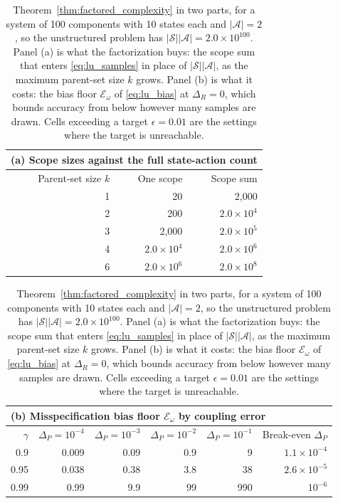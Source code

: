 \begin{table}[htbp]
\centering
\caption{Theorem~\ref{thm:factored_complexity} in two parts, for a system of 100 components with 10 states each and $|\mathcal{A}| = 2$, so the unstructured problem has $|\mathcal{S}||\mathcal{A}| = 2.0 \times 10^{100}$. Panel (a) is what the factorization buys: the scope sum that enters \eqref{eq:lu_samples} in place of $|\mathcal{S}||\mathcal{A}|$, as the maximum parent-set size $k$ grows. Panel (b) is what it costs: the bias floor $\mathcal{E}_\omega$ of \eqref{eq:lu_bias} at $\Delta_R = 0$, which bounds accuracy from below however many samples are drawn. Cells exceeding a target $\epsilon = 0.01$ are the settings where the target is unreachable.}
\label{tab:curse_factored}
\begin{tabular}{rrr}
\multicolumn{3}{l}{(a) Scope sizes against the full state-action count} \\
\toprule
Parent-set size $k$ & One scope & Scope sum \\
\midrule
1 & 20 & 2,000 \\
2 & 200 & $2.0 \times 10^{4}$ \\
3 & 2,000 & $2.0 \times 10^{5}$ \\
4 & $2.0 \times 10^{4}$ & $2.0 \times 10^{6}$ \\
6 & $2.0 \times 10^{6}$ & $2.0 \times 10^{8}$ \\
\bottomrule
\end{tabular}

\vspace{1em}

\begin{tabular}{rrrrrr}
\multicolumn{6}{l}{(b) Misspecification bias floor $\mathcal{E}_\omega$ by coupling error} \\
\toprule
$\gamma$ & $\Delta_P = 10^{-4}$ & $\Delta_P = 10^{-3}$ & $\Delta_P = 10^{-2}$ & $\Delta_P = 10^{-1}$ & Break-even $\Delta_P$ \\
\midrule
0.9 & 0.009 & 0.09 & 0.9 & 9 & $1.1 \times 10^{-4}$ \\
0.95 & 0.038 & 0.38 & 3.8 & 38 & $2.6 \times 10^{-5}$ \\
0.99 & 0.99 & 9.9 & 99 & 990 & $10^{-6}$ \\
\bottomrule
\end{tabular}
\end{table}
